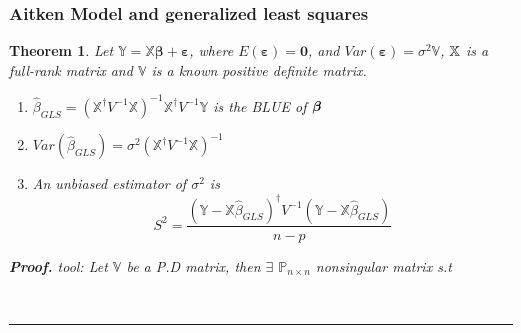 \documentclass{article}
\newtheorem{theorem}{Theorem}
\newenvironment{proof}[1][Proof]{\noindent\textbf{#1.} }{\ \rule{0.5em}{0.5em}}
\begin{document}
\setcounter{part}{1} \setcounter{page}{1}

\subsubsection{Aitken Model and generalized least squares}

\begin{theorem}
Let $\mathbb{Y}=\mathbb{X}\boldsymbol{\beta }+\boldsymbol{\varepsilon }$,
where $E\left( \boldsymbol{\varepsilon }\right) =\boldsymbol{0}$, and $%
Var\left( \boldsymbol{\varepsilon }\right) =\sigma ^{2}\mathbb{V}$, $\mathbb{%
X}$ is a full-rank matrix and $\mathbb{V}$ is a known positive definite
matrix.

\begin{enumerate}
\item $\hat{\beta}_{GLS}=\left( \mathbb{X}^{\dagger }V^{-1}\mathbb{X}\right)
^{-1}\mathbb{X}^{\dagger }V^{-1}\mathbb{Y}$ is the BLUE of $\boldsymbol{%
\beta }$

\item $Var\left( \hat{\beta}_{GLS}\right) =\sigma ^{2}\left( \mathbb{X}%
^{\dagger }V^{-1}\mathbb{X}\right) ^{-1}$

\item An unbiased estimator of $\sigma ^{2}$ is%
\begin{equation*}
S^{2}=\frac{\left( \mathbb{Y-X}\hat{\beta}_{GLS}\right) ^{\dagger
}V^{-1}\left( \mathbb{Y-X}\hat{\beta}_{GLS}\right) }{n-p}
\end{equation*}%
\newline
\newline
\end{enumerate}

\begin{proof}
\newline
tool: Let $\mathbb{V}$ be a P.D matrix, then $\exists $ $\mathbb{P}_{n\times
n}$ nonsingular matrix s.t 


\end{proof}
\end{theorem}
\end{document}
